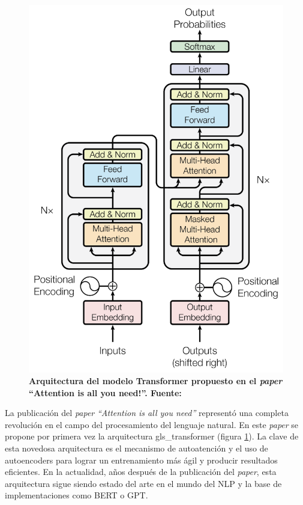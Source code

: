 \begin{figure}[ht!]
    \centering
    \includegraphics[scale=0.8]{figuras/intro-bert-transformers.png}
    \caption[BERT - Arquitectura de Transformer]{\textbf{Arquitectura del modelo Transformer propuesto en el \textit{paper} ``Attention is all you need!''. Fuente: \citep{https://doi.org/10.48550/arxiv.1706.03762}}}
    \label{fig-intro-bert-transformers}
\end{figure}

La publicación del \textit{paper} \textit{``Attention is all you need''} \citep{https://doi.org/10.48550/arxiv.1706.03762} representó una completa revolución en el campo del procesamiento del lenguaje natural. En este \textit{paper} se propone por primera vez la arquitectura \Gls{gls_transformer} (figura \ref{fig-intro-bert-transformers}). La clave de esta novedosa arquitectura es el mecanismo de autoatención y el uso de autoencoders para lograr un entrenamiento más ágil y producir resultados eficientes. En la actualidad, años después de la publicación del \textit{paper}, esta arquitectura sigue siendo estado del arte en el mundo del NLP y la base de implementaciones como BERT o GPT.


